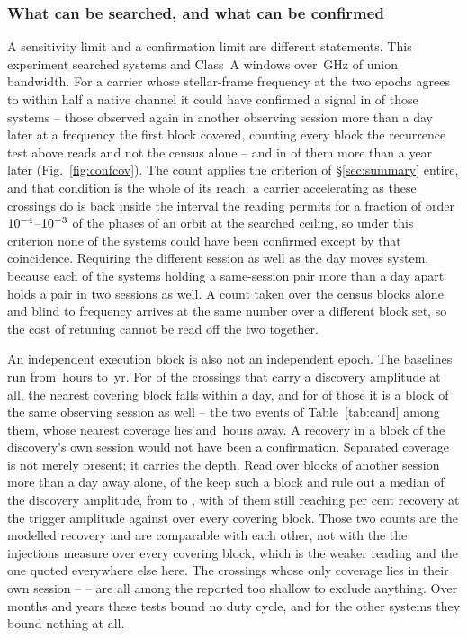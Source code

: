 \subsubsection{What can be searched, and what can be confirmed}
\label{sec:confirmability}

A sensitivity limit and a confirmation limit are different statements. This experiment searched \RcSearchSys{} systems and \RcSearchWin{}
Class~A windows over \CvUnionA\,GHz of union bandwidth. For a carrier whose
stellar-frame frequency at the two epochs agrees to within half a native
channel it could have
confirmed a signal in \ZcConfSysDay{} of those systems -- those observed
again in another observing session more than a day later at a frequency the
first block covered, counting every block the recurrence test above reads and
not the census alone -- and
in \ZcConfSysYr{} of them more than a year later
(Fig.~\ref{fig:confcov}). The count applies the criterion of
\S\ref{sec:summary} entire, and that condition is the whole of its reach: a
carrier accelerating as these crossings do is back inside the interval the
reading permits for a fraction of order
$10^{-4}$--$10^{-3}$ of the phases of an orbit at the
searched ceiling, so under this criterion none of the \NSysClassA{} systems
could have been confirmed except by that coincidence. Requiring the different session as well as the day
moves \QfNSysMovedWord{} system, because each of the \QfNSysPairDropWord{}
systems holding a same-session pair more than a day apart holds a pair in two
sessions as well. A count taken over the census blocks alone and blind to
frequency arrives at the same number over a different block set, so the cost
of retuning cannot be read off the two together.

An independent execution block is also not an independent epoch. The baselines run from \RcSepMinH\,hours to \RcSepMaxYr\,yr. For
\RcNSepSameDay{} of the \RcNExclPoss{} crossings that carry a discovery
amplitude at all, the nearest covering block falls within a day, and for
\QcNHazard{} of those it is a block of the same observing session as well --
the two events of Table~\ref{tab:cand} among them, whose nearest coverage lies
\QcEvSepOneH{} and \QcEvSepTwoH\,hours away. A recovery in a block of the
discovery's own session would not have been a confirmation. Separated coverage is not merely present; it carries the depth. Read over
blocks of another session more than a day away alone, \SpNSep{} of the
\RcNExcl{} keep such a block and rule out a median \SpFracMed{} of the
discovery amplitude, from \SpFracMin{} to \SpFracMax, with \SpNPower{} of
them still reaching \RcPowerLevel{} per cent recovery at the trigger
amplitude against \RqNPowerHi{} over every covering block. Those two
counts are the modelled recovery and are comparable with each other, not
with the \HjNPowerHi{} the injections measure over every covering block,
which is the weaker reading and the one quoted everywhere else here.
The \QfNExclSameOnlyWord{} crossings whose
only coverage lies in their own session -- \SpNoSepList{} -- are all among
the \HjNPowerLo{} reported too shallow to exclude anything.
Over months and years these tests
bound no duty cycle, and for the other \ZcNoRepSys{} systems they bound
nothing at all.

